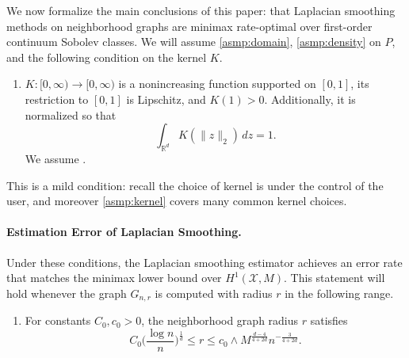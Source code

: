 \documentclass[twoside]{article}
\newcommand{\Reals}{\mathbb{R}}
\newcommand{\1}{\mathbf{1}}
\newcommand{\Rd}{\Reals^d}
\newcommand{\Xset}{\mathcal{X}}
\newcommand{\wh}[1]{\widehat{#1}}
\theoremstyle{definition}
\theoremstyle{remark}
\begin{document}
We now formalize the main conclusions of this paper: that Laplacian smoothing methods on neighborhood graphs are minimax rate-optimal over first-order continuum Sobolev classes. We will assume \ref{asmp:domain}, \ref{asmp:density} on $P$, and the following condition on the kernel $K$.
\begin{enumerate}[label=(K\arabic*)]
	\item
	\label{asmp:kernel}
	$K:[0,\infty) \to [0,\infty)$ is a nonincreasing function supported on $[0,1]$, its restriction to $[0,1]$ is Lipschitz, and $K(1) > 0$. Additionally, it is normalized so that
	\begin{equation*}
	\int_{\Rd} K(\|z\|_2) \,dz = 1.
	\end{equation*}
	We assume \smash{$\sigma_K = \frac{1}{d} \int_{\Rd} \|x\|_2^2 K(\|x\|_2) \,dx < \infty$}.
\end{enumerate}
This is a mild condition: recall the choice of kernel is under the control of the user, and moreover \ref{asmp:kernel} covers many common kernel choices.

\paragraph{Estimation Error of Laplacian Smoothing.} 

Under these conditions, the Laplacian smoothing estimator \smash{$\wh{f}$} achieves an error rate that matches the minimax lower bound over $H^1(\Xset,M)$. This statement will hold whenever the graph $G_{n,r}$ is computed with radius $r$ in the following range.
\begin{enumerate}[label=(R\arabic*)]
	\setcounter{enumi}{0}
	\item 
	\label{asmp:ls_kernel_radius_estimation}
	For constants $C_0,c_0>0$, the neighborhood graph radius $r$ satisfies
	\begin{equation*}
	C_0 \biggl(\frac{\log n}{n}\biggr)^{\frac{1}{d}} \leq r \leq c_0 \wedge M^{\frac{d - 4}{4 + 2d}} n^{-\frac{3}{4 + 2d}}.  
	\end{equation*}
\end{enumerate}
\end{document}
